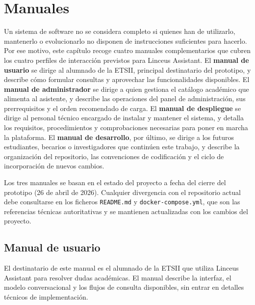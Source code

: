 
\chapter{Manuales}\label{cap:manuales}

Un sistema de software no se considera completo si quienes han de utilizarlo, mantenerlo o evolucionarlo no disponen de instrucciones suficientes para hacerlo. Por ese motivo, este capítulo recoge cuatro manuales complementarios que cubren los cuatro perfiles de interacción previstos para Linceus Assistant. El \textbf{manual de usuario} se dirige al alumnado de la ETSII, principal destinatario del prototipo, y describe cómo formular consultas y aprovechar las funcionalidades disponibles. El \textbf{manual de administrador} se dirige a quien gestiona el catálogo académico que alimenta al asistente, y describe las operaciones del panel de administración, sus prerrequisitos y el orden recomendado de carga. El \textbf{manual de despliegue} se dirige al personal técnico encargado de instalar y mantener el sistema, y detalla los requisitos, procedimientos y comprobaciones necesarias para poner en marcha la plataforma. El \textbf{manual de desarrollo}, por último, se dirige a los futuros estudiantes, becarios o investigadores que continúen este trabajo, y describe la organización del repositorio, las convenciones de codificación y el ciclo de incorporación de nuevos cambios.

Los tres manuales se basan en el estado del proyecto a fecha del cierre del prototipo (26 de abril de 2026). Cualquier divergencia con el repositorio actual debe consultarse en los ficheros \texttt{README.md} y \texttt{docker-compose.yml}, que son las referencias técnicas autoritativas y se mantienen actualizadas con los cambios del proyecto.

\section{Manual de usuario}\label{sec:manual-usuario}

El destinatario de este manual es el alumnado de la ETSII que utiliza Linceus Assistant para resolver dudas académicas. El manual describe la interfaz, el modelo conversacional y los flujos de consulta disponibles, sin entrar en detalles técnicos de implementación.

